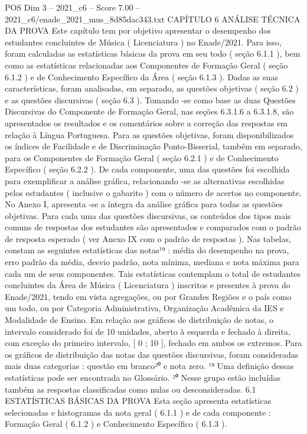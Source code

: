 \begin{textsample}{POS Dim 3 – 2021\_c6 – Score 7.00 – 2021\_c6/enade\_2021\_mus\_8d85dac343.txt}  \label{ex:f3_pos_043}
CAPÍTULO 6 ANÁLISE TÉCNICA DA PROVA Este capítulo tem por objetivo apresentar o desempenho dos estudantes concluintes de Música ( Licenciatura ) no Enade/2021.
Para isso, foram calculadas as estatísticas básicas da prova em seu todo ( seção 6.1.1 ), bem como as estatísticas relacionadas aos Componentes de Formação Geral ( seção 6.1.2 ) e de Conhecimento Específico da Área ( seção 6.1.3 ).
Dadas as suas características, foram analisadas, em separado, as questões objetivas ( seção 6.2 ) e as questões discursivas ( seção 6.3 ).
Tomando -se como base as duas Questões Discursivas do Componente de Formação Geral, nas seções 6.3.1.6 a 6.3.1.8, são apresentados os resultados e os comentários sobre a correção das respostas em relação à Língua Portuguesa.
Para as questões objetivas, foram disponibilizados os índices de Facilidade e de Discriminação Ponto-Bisserial, também em separado, para os Componentes de Formação Geral ( seção 6.2.1 ) e de Conhecimento Específico ( seção 6.2.2 ).
De cada componente, uma das questões foi escolhida para exemplificar a análise gráfica, relacionando -se as alternativas escolhidas pelos estudantes ( inclusive o gabarito ) com o número de acertos no componente.
No Anexo I, apresenta -se a íntegra da análise gráfica para todas as questões objetivas.
Para cada uma das questões discursivas, os conteúdos dos tipos mais comuns de respostas dos estudantes são apresentados e comparados com o padrão de resposta esperado ( ver Anexo IX com o padrão de respostas ).
Nas tabelas, constam as seguintes estatísticas das notas¹⁹ : média do desempenho na prova, erro padrão da média, desvio padrão, nota mínima, mediana e nota máxima para cada um de seus componentes.
Tais estatísticas contemplam o total de estudantes concluintes da Área de Música ( Licenciatura ) inscritos e presentes à prova do Enade/2021, tendo em vista agregações, ou por Grandes Regiões e o país como um todo, ou por Categoria Administrativa, Organização Acadêmica da IES e Modalidade de Ensino.
Em relação aos gráficos de distribuição de notas, o intervalo considerado foi de 10 unidades, aberto à esquerda e fechado à direita, com exceção do primeiro intervalo, [ 0 ; 10 ], fechado em ambos os extremos.
Para os gráficos de distribuição das notas das questões discursivas, foram consideradas mais duas categorias : questão em branco²⁰ e nota zero. ¹⁹ Uma definição dessas estatísticas pode ser encontrada no Glossário. ²⁰ Nesse grupo estão incluídas também as respostas classificadas como nulas ou desconsideradas. 6.1 ESTATÍSTICAS BÁSICAS DA PROVA Esta seção apresenta estatísticas selecionadas e histogramas da nota geral ( 6.1.1 ) e de cada componente : Formação Geral ( 6.1.2 ) e Conhecimento Específico ( 6.1.3 ).

\end{textsample}
